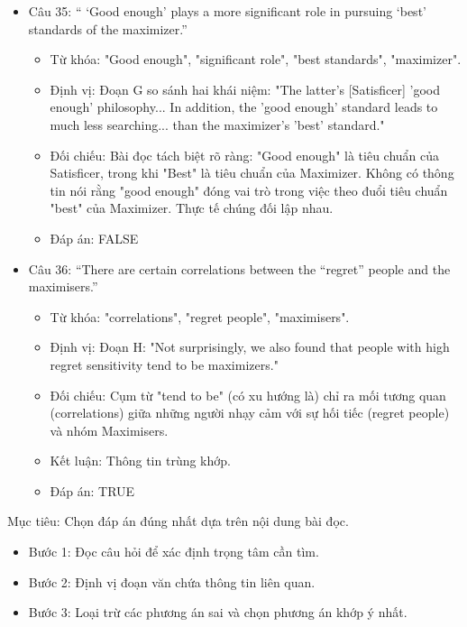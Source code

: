 \documentclass{../templateReading/cdreading}
\begin{document}
\begin{itemize}
\item Câu 35: “ ‘Good enough’ plays a more significant role in pursuing ‘best’ standards of the maximizer.”
\begin{itemize}
\item Từ khóa: "Good enough", "significant role", "best standards", "maximizer".
\item Định vị: Đoạn G so sánh hai khái niệm: "The latter’s [Satisficer] 'good enough' philosophy... In addition, the 'good enough' standard leads to much less searching... than the maximizer’s 'best' standard."
\item Đối chiếu: Bài đọc tách biệt rõ ràng: "Good enough" là tiêu chuẩn của Satisficer, trong khi "Best" là tiêu chuẩn của Maximizer. Không có thông tin nói rằng "good enough" đóng vai trò trong việc theo đuổi tiêu chuẩn "best" của Maximizer. Thực tế chúng đối lập nhau.
\item Đáp án: FALSE
\end{itemize}
\item Câu 36: “There are certain correlations between the “regret” people and the maximisers.”
\begin{itemize}
\item Từ khóa: "correlations", "regret people", "maximisers".
\item Định vị: Đoạn H: "Not surprisingly, we also found that people with high regret sensitivity tend to be maximizers."
\item Đối chiếu: Cụm từ "tend to be" (có xu hướng là) chỉ ra mối tương quan (correlations) giữa những người nhạy cảm với sự hối tiếc (regret people) và nhóm Maximisers.
\item Kết luận: Thông tin trùng khớp.
\item Đáp án: TRUE
\end{itemize}
\end{itemize}


Mục tiêu: Chọn đáp án đúng nhất dựa trên nội dung bài đọc.

\begin{itemize}
\item Bước 1: Đọc câu hỏi để xác định trọng tâm cần tìm.
\item Bước 2: Định vị đoạn văn chứa thông tin liên quan.
\item Bước 3: Loại trừ các phương án sai và chọn phương án khớp ý nhất.
\end{itemize}
\end{document}
